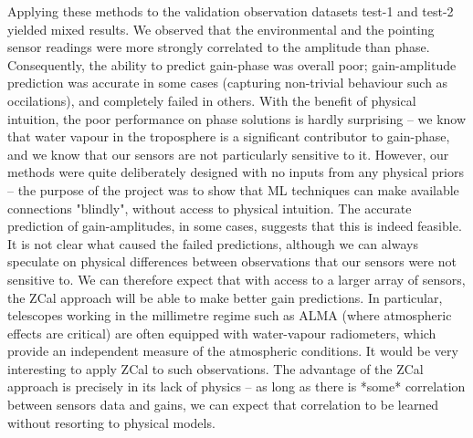 Applying these methods to the validation observation datasets test-1 and test-2 yielded mixed results. We observed that the environmental and the pointing sensor readings were more strongly correlated to the amplitude than phase. Consequently, the ability to predict gain-phase was overall poor; gain-amplitude prediction was accurate in some cases (capturing non-trivial behaviour such as occilations), and completely failed in others. With the benefit of physical intuition, the poor performance on phase solutions is hardly surprising -- we know that water vapour in the troposphere is a significant contributor to gain-phase, and we know that our sensors are not particularly sensitive to it. However, our methods were quite deliberately designed with no inputs from any physical priors -- the purpose of the project was to show that ML techniques can make available connections "blindly", without access to physical intuition. The accurate prediction of gain-amplitudes, in some cases, suggests that this is indeed feasible. It is not clear what caused the failed predictions, although we can always speculate on physical differences between observations that our sensors were not sensitive to. We can therefore expect that with access to a larger array of sensors, the ZCal approach will be able to make better gain predictions. In particular, telescopes working in the millimetre regime such as ALMA (where atmospheric effects are critical) are often equipped with water-vapour radiometers, which provide an independent measure of the atmospheric conditions. It would be very interesting to apply ZCal to such observations. The advantage of the ZCal approach is precisely in its lack of physics -- as long as there is *some* correlation between sensors data and gains, we can expect that correlation to be learned without resorting to physical models.









